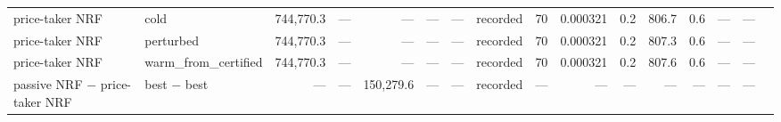\begin{table}[htbp]
\begin{tabular}{llrrrrrlrrrrrrrl}
price-taker NRF & cold & 744,770.3 & --- & --- & --- & --- & recorded & 70 & 0.000321 & 0.2 & 806.7 & 0.6 & --- & --- &  \\
price-taker NRF & perturbed & 744,770.3 & --- & --- & --- & --- & recorded & 70 & 0.000321 & 0.2 & 807.3 & 0.6 & --- & --- &  \\
price-taker NRF & warm\_from\_certified & 744,770.3 & --- & --- & --- & --- & recorded & 70 & 0.000321 & 0.2 & 807.6 & 0.6 & --- & --- &  \\
passive NRF $-$ price-taker NRF & best $-$ best & --- & --- & 150,279.6 & --- & --- & recorded & --- & --- & --- & --- & --- & --- & --- &  \\
\bottomrule
\end{tabular}
\end{table}
